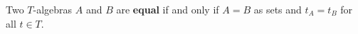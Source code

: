 Two $T$-algebras $A$ and $B$ are \textbf{equal} if and only if $A = B$ as sets and $t_A = t_B$ for all $t \in T$.
